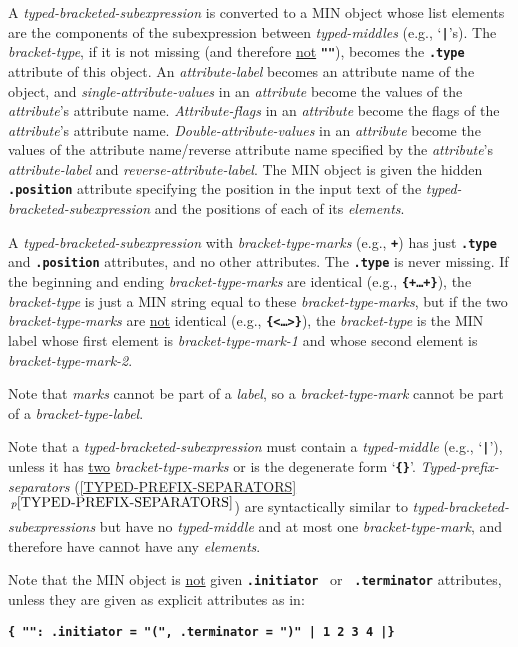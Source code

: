 \documentclass[12pt]{article}
\newcommand{\TT}[1]{{\tt \bfseries #1}}
\newcommand{\itemref}[1]{\ref{#1}$\,^{p\pageref{#1}}$}
\begin{document}
A {\em typed-bracketed-subexpression} is converted to a
MIN object whose list elements are the components of the
subexpression between {\em typed-middles} (e.g., `\TT{|}'s).  The
{\em bracket-type}, if it is not missing
(and therefore \underline{not} \TT{""}), becomes the \TT{.type}
attribute of this object.  An {\em attribute-label}
becomes an attribute name of the object, and
{\em single-attribute-values} in an {\em attribute}
become the values of the {\em attribute}'s attribute name.
{\em Attribute-flags} in an {\em attribute}
become the flags of the {\em attribute}'s attribute name.
{\em Double-attribute-values} in an {\em attribute}
become the values of the attribute name/reverse attribute name
specified by the {\em attribute}'s {\em attribute-label} and
{\em reverse-attribute-label}.  The MIN object is given the
hidden \TT{.position} attribute specifying the position in the
input text of the {\em typed-bracketed-subexpression} and the
positions of each of its {\em elements}.

A {\em typed-bracketed-subexpression} with {\em bracket-type-marks}
(e.g., \TT{+}) has just \TT{.type} and \TT{.pos\-i\-tion}
attributes, and no other attributes.  The \TT{.type}
is never missing.  If the beginning and ending
{\em bracket-type-marks} are identical (e.g., \TT{\{+\ldots+\}}),
the {\em bracket-type}
is just a MIN string equal to these {\em bracket-type-marks},
but if the two {\em bracket-type-marks} are \underline{not} identical
(e.g., \TT{\{<\ldots>\}}),
the {\em bracket-type} is the MIN label whose first element is
{\em bracket-type-mark-1} and whose second element is
{\em bracket-type-mark-2}.

Note that {\em marks} cannot be part of a {\em label}, so a
{\em bracket-type-mark} cannot be part of a {\em bracket-type-label}.

Note that a {\em typed-bracketed-subexpression} must contain a
{\em typed-middle} (e.g., `\TT{|}'), unless it has
\underline{two} {\em bracket-type-marks} or is the degenerate
form `\TT{\{\}}'.
{\em Typed-prefix-separators} (\itemref{TYPED-PREFIX-SEPARATORS})
are syntactically similar to {\em typed-bracketed-subexpressions}
but have no {\em typed-middle} and at most one {\em bracket-type-mark},
and therefore have cannot have any {\em elements}.

Note that the MIN object is \underline{not} given \TT{.initiator}
~or~ \TT{.terminator} attributes, unless they are given as explicit
attributes as in:
\begin{center}
\TT{\{ "":~.initiator = "(", .terminator = ")" | 1 2 3 4 |\}}
\end{center}
\end{document}
